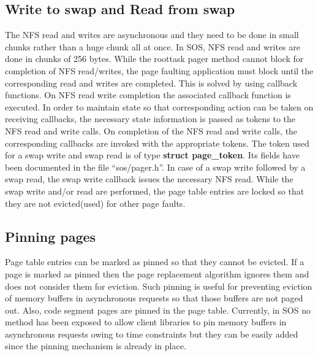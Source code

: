 \documentclass[a4paper, 11pt]{article}
\begin{document}
\subsection{Write to swap and Read from swap}
The NFS read and writes are asynchronous and they need to be done
in small chunks rather than a huge chunk all at once. In SOS, NFS read
and writes are done in chunks of 256 bytes. While the roottask pager
method cannot block for completion of NFS read/writes, the page
faulting application must block until the corresponding read and
writes are completed. This is solved by using callback functions. On
NFS read write completion the associated callback function is
executed. In order to maintain state so that corresponding action can
be taken on receiving callbacks, the necessary state information is
passed as tokens to the NFS read and write calls. On completion of the
NFS read and write calls, the corresponding callbacks are invoked with
the appropriate tokens. The token used for a swap write and swap read
is of type {\bf struct page\_token}. Its fields have been documented
in the file ``sos/pager.h''. In case of a swap write followed by a
swap read, the swap write callback issues the necessary NFS
read. While the swap write and/or read are performed, the page table
entries are locked so that they are not evicted(used) for other page
faults. 
\subsection{Pinning pages}
Page table entries can be marked as pinned so that they cannot be
evicted. If a page is marked as pinned then the page replacement
algorithm ignores them and does not consider them for eviction. Such
pinning is useful for preventing eviction of memory buffers in
asynchronous requests so that those buffers are not paged
out. Also, code segment pages are pinned in the page table. Currently,
in SOS no method has been exposed to allow client libraries to pin
memory buffers in asynchronous requests owing to time constraints but
they can be easily added since the pinning mechanism is already in place.
\newpage
\end{document}
